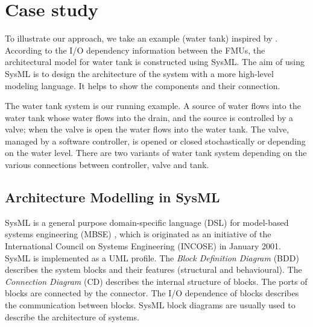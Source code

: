 
\section{Case study}
\label{sec:sysml}
To illustrate our approach, we take an example (water tank) inspired by \cite{AmalioPCW16}. According to the I/O dependency information between the FMUs, the architectural model for water tank is constructed using SysML. The aim of using SysML is to design the architecture of the system with a more high-level modeling language. It helps to show the components and their connection.


The water tank system is our running example. A source of water flows into the water tank whose water flows into the drain, and the source is controlled by a valve; when the valve is open the water flows into the water tank. The valve, managed by a software controller, is opened or closed stochastically or depending on the water level. There are two variants of water tank system depending on the various connections between controller, valve and tank. 

\subsection{Architecture Modelling in SysML}
SysML is a general purpose domain-specific language (DSL) \cite{SemerathBHSV17} for model-based systems engineering (MBSE) \cite{Dori16}, which is originated as an initiative of the International Council on Systems Engineering (INCOSE) \cite{Pepper2015International} in January 2001. SysML is implemented as a UML profile. The \textit{Block Definition Diagram }(BDD) describes the system blocks and their features (structural and behavioural). The\textit{ Connection Diagram} (CD) describes the internal structure of blocks. The ports of blocks are connected by the connector. The I/O dependence of blocks describes the communication between blocks. SysML block diagrams are usually used to describe the architecture of systems.

